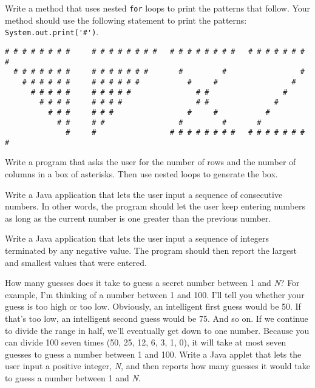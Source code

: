 \begin{EXRtwo}
\item  Write a method that uses nested {\tt for} loops to print the 
patterns that follow. Your method should use the following statement
to print the patterns: \verb|System.out.print('#')|.

\begin{jjjlisting}
\begin{lstlisting}[basicstyle=\scriptsize]
# # # # # # # #     # # # # # # # #   # # # # # # # #   # # # # # # # #
  # # # # # # #     # # # # # # #       #         #                 #
    # # # # # #     # # # # # #           #     #                 #
      # # # # #     # # # # #               # #                 #
        # # # #     # # # #                 # #               #
          # # #     # # #                 #     #           #
            # #     # #                 #         #       #
              #     #                 # # # # # # # #   # # # # # # # #
\end{lstlisting}
\end{jjjlisting}

\item  Write a program that asks the user for the number
of rows and the number of columns in a box of asterisks. Then
use nested loops to generate the box.

\item  Write a Java application that lets the user input a sequence
of consecutive numbers. In other words, the program should let the
user keep entering numbers as long as the current number is one
greater than the previous number.

\item  Write a Java application that lets the user input
a sequence of integers terminated by any negative value. The
program should then report the largest and smallest values
that were entered.

\item How many guesses does it take to guess a secret number between 1
and {\it N}? For example, I'm thinking of a number between 1 and
100. I'll tell you whether your guess is too high or too
low. Obviously, an intelligent first guess would be 50. If that's too
low, an intelligent second guess would be 75.  And so on. If we
continue to divide the range in half, we'll eventually get down to one
number. Because you can divide 100 seven times (50, 25, 12, 6, 3, 1,
0), it will take at most seven guesses to guess a number between 1 and
100. Write a Java applet that lets the user input a positive integer,
{\it N}, and then reports how many guesses it would take to guess a
number between 1 and {\it N}.


\end{EXRtwo}
